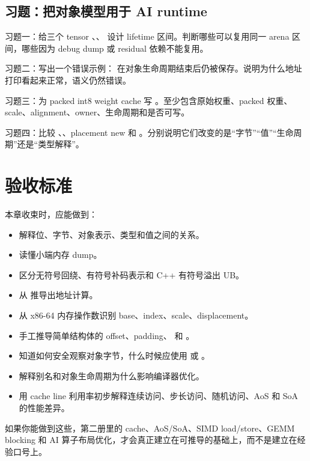 \subsection{习题：把对象模型用于 AI runtime}

\begin{exercisebox}
习题一：给三个 tensor 、、 设计 lifetime 区间。判断哪些可以复用同一 arena 区间，哪些因为 debug dump 或 residual 依赖不能复用。

习题二：写出一个错误示例： 在对象生命周期结束后仍被保存。说明为什么地址打印看起来正常，语义仍然错误。

习题三：为 packed int8 weight cache 写 。至少包含原始权重、packed 权重、scale、alignment、owner、生命周期和是否可写。

习题四：比较 、、placement new 和 。分别说明它们改变的是“字节”“值”“生命周期”还是“类型解释”。
\end{exercisebox}

\section{验收标准}

本章收束时，应能做到：

\begin{itemize}
  \item 解释位、字节、对象表示、类型和值之间的关系。
  \item 读懂小端内存 dump。
  \item 区分无符号回绕、有符号补码表示和 C++ 有符号溢出 UB。
  \item 从  推导出地址计算。
  \item 从 x86-64 内存操作数识别 base、index、scale、displacement。
  \item 手工推导简单结构体的 offset、padding、 和 。
  \item 知道如何安全观察对象字节，什么时候应使用  或 。
  \item 解释别名和对象生命周期为什么影响编译器优化。
  \item 用 cache line 利用率初步解释连续访问、步长访问、随机访问、AoS 和 SoA 的性能差异。
\end{itemize}

如果你能做到这些，第二册里的 cache、AoS/SoA、SIMD load/store、GEMM blocking 和 AI 算子布局优化，才会真正建立在可推导的基础上，而不是建立在经验口号上。
